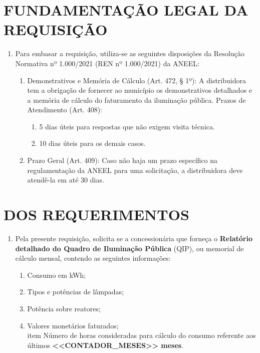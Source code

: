 \newcommand{\tipoRequerimento}{Solicitação do Quadro de Iluminação Pública}

\section{FUNDAMENTAÇÃO LEGAL DA REQUISIÇÃO}

\begin{enumerate}[resume]
\item
  Para embasar a requisição, utiliza-se as seguintes disposições da Resolução Normativa nº 1.000/2021 (REN nº 1.000/2021) da ANEEL:
  \begin{enumerate}
  \item
    Demonstrativos e Memória de Cálculo (Art. 472, § 1º): A distribuidora tem a obrigação de fornecer ao município os demonstrativos detalhados e a memória de cálculo do faturamento da iluminação pública. Prazos de Atendimento (Art. 408):
    \begin{enumerate}
      \item  
      5 dias úteis para respostas que não exigem visita técnica.
      \item 
      10 dias úteis para os demais casos.
    \end{enumerate}
  \item 
  Prazo Geral (Art. 409): Caso não haja um prazo específico na regulamentação da ANEEL para uma solicitação, a distribuidora deve atendê-la em até 30 dias.
  \end{enumerate}
\end{enumerate}

\section{DOS REQUERIMENTOS}

\begin{enumerate}[resume]
\item Pela presente requisição, solicita se a concessionária que forneça o \textbf{Relatório detalhado do Quadro de Iluminação Pública} (QIP), ou memorial de cálculo mensal, contendo as seguintes informações: 
\begin{enumerate}
  \item Consumo em kWh;
  \item Tipos e potências de lâmpadas;
  \item Potência sobre reatores;
  \item Valores monetários faturados;
  \\item Número de horas consideradas para cálculo do consumo referente aos últimos \textbf{<<CONTADOR_MESES>> meses}.
\end{enumerate}
\end{enumerate}


